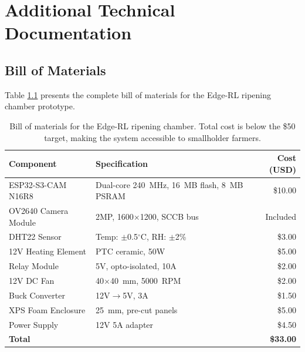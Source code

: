 
\appendix
{}
{}

\chapter{Additional Technical Documentation}
    \label{ch:Appendix}

\section{Bill of Materials}
    \label{sec:BOM}

    Table \ref{tab:bom} presents the complete bill of materials for the Edge-RL ripening chamber prototype.

    \begin{table}[ht]
        \caption{Bill of materials for the Edge-RL ripening chamber. Total cost is below the \$50 target, making the system accessible to smallholder farmers.}
        \label{tab:bom}
        \centering
        \begin{tabular}{llr}
            \hline
            \textbf{Component} & \textbf{Specification} & \textbf{Cost (USD)} \\
            \hline
            ESP32-S3-CAM N16R8 & Dual-core 240~MHz, 16~MB flash, 8~MB PSRAM & \$10.00 \\
            OV2640 Camera Module & 2MP, 1600$\times$1200, SCCB bus & Included \\
            DHT22 Sensor & Temp: $\pm$0.5$^{\circ}$C, RH: $\pm$2\% & \$3.00 \\
            12V Heating Element & PTC ceramic, 50W & \$5.00 \\
            Relay Module & 5V, opto-isolated, 10A & \$2.00 \\
            12V DC Fan & 40$\times$40~mm, 5000~RPM & \$2.00 \\
            Buck Converter & 12V$\to$5V, 3A & \$1.50 \\
            XPS Foam Enclosure & 25~mm, pre-cut panels & \$5.00 \\
            Power Supply & 12V 5A adapter & \$4.50 \\
            \hline
            \textbf{Total} & & \textbf{\$33.00} \\
            \hline
        \end{tabular}
    \end{table}

